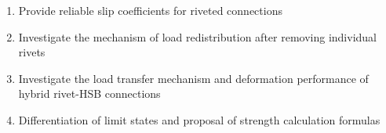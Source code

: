\begin{enumerate}
    \item Provide reliable slip coefficients for riveted connections
    \item Investigate the mechanism of load redistribution after removing individual rivets
    \item Investigate the load transfer mechanism and deformation performance of hybrid rivet-\ac{HSB} connections
    \item Differentiation of limit states and proposal of strength calculation formulas
\end{enumerate}

